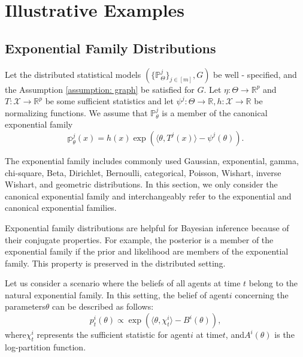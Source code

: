 \documentclass[twoside,11pt]{article}
\numberwithin{equation}{section}
\newcommand{\R}{{\mathbb{R}}}
\newcommand\bP{\mathbb{P}}
\newcommand\bp{\mathbb{p}}
\newcommand{\X}{\mathcal{X}}
\begin{document}
{\section{Illustrative Examples} \label{sect:examples}
\subsection{Exponential Family Distributions} \label{subsect:EF}
 Let the distributed statistical models $\left(\{\bP_\Theta^j\}_{j \in [m]}, G \right)$ be well - specified, and the Assumption \ref{assumption: graph} be satisfied for $G$. Let $\eta: \Theta \to \R^p$ and $T: \mathcal{X} \to \R^p$ be some sufficient statistics and let $\psi^j: \Theta \to \R, h: \X \to \R$ be normalizing functions. We assume that $\bP_\theta^j$ is a member of the canonical exponential family 
\begin{equation} \label{eqn-EF-1}
    \bp_\theta^j(x) = h(x) \exp\left(\langle \theta, T^j(x)\rangle - \psi^j(\theta) \right). 
\end{equation}

The exponential family includes commonly used Gaussian, exponential, gamma, chi-square, Beta, Dirichlet, Bernoulli, categorical, Poisson, Wishart, inverse Wishart, and geometric distributions. In this section, we only consider the canonical exponential family and interchangeably refer to the exponential and canonical exponential families. 

Exponential family distributions are helpful for Bayesian inference because of their conjugate properties. For example, the posterior is a member of the exponential family if the prior and likelihood are members of the exponential family. This property is preserved in the distributed setting. 

Let us consider a scenario where the beliefs of all agents at time $t$ belong to the natural exponential family. In this setting, the belief of agent$i$ concerning the parameters$\theta$ can be described as follows:
\begin{equation*}
    p_t^i(\theta) \propto \exp\left( \langle \theta,  \chi_t^i \rangle - B^i(\theta) \right), 
\end{equation*}
where$\chi_t^i$ represents the sufficient statistic for agent$i$ at time$t$, and$A^i(\theta)$ is the log-partition function.

}
\end{document}
